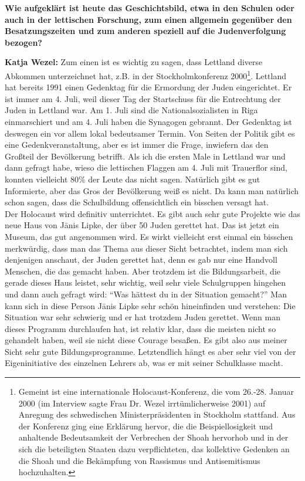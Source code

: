 \textbf{Wie aufgeklärt ist heute das Geschichtsbild, etwa in den Schulen oder auch in der lettischen Forschung, zum einen allgemein gegenüber den Besatzungszeiten und zum anderen speziell auf die Judenverfolgung bezogen?} 

\textbf{Katja Wezel:} Zum einen ist es wichtig zu sagen, dass Lettland diverse Abkommen unterzeichnet hat, z.B. in der Stockholmkonferenz 2000\footnote{Gemeint ist eine internationale Holocaust-Konferenz, die vom 26.-28. Januar 2000 (im Interview sagte Frau Dr. Wezel irrtümlicherweise 2001) auf Anregung des schwedischen Ministerpräsidenten in Stockholm stattfand. Aus der Konferenz ging eine Erklärung hervor, die die Beispiellosigkeit und anhaltende Bedeutsamkeit der Verbrechen der Shoah hervorhob und in der sich die beteiligten Staaten dazu verpflichteten, das kollektive Gedenken an die Shoah und die Bekämpfung von Rassismus und Antisemitismus hochzuhalten.}. Lettland hat bereits 1991 einen Gedenktag für die Ermordung der Juden eingerichtet. Er ist immer am 4. Juli, weil dieser Tag der Startschuss für die Entrechtung der Juden in Lettland war. Am 1. Juli sind die Nationalsozialisten in Riga einmarschiert und am 4. Juli haben die Synagogen gebrannt. Der Gedenktag ist deswegen ein vor allem lokal bedeutsamer Termin. Von Seiten der Politik gibt es eine Gedenkveranstaltung, aber es ist immer die Frage, inwiefern das den Großteil der Bevölkerung betrifft. Als ich die ersten Male in Lettland war und dann gefragt habe, wieso die lettischen Flaggen am 4. Juli mit Trauerflor sind, konnten vielleicht 80\% der Leute das nicht sagen. Natürlich gibt es gut Informierte, aber das Gros der Bevölkerung weiß es nicht. Da kann man natürlich schon sagen, dass die Schulbildung offensichtlich ein bisschen versagt hat.\\ 
Der Holocaust wird definitiv unterrichtet. Es gibt auch sehr gute Projekte wie das neue Haus von Jānis Lipke, der über 50 Juden gerettet hat. Das ist jetzt ein Museum, das gut angenommen wird. Es wirkt vielleicht erst einmal ein bisschen merkwürdig, dass man das Thema aus dieser Sicht betrachtet, indem man sich denjenigen anschaut, der Juden gerettet hat, denn es gab nur eine Handvoll Menschen, die das gemacht haben. Aber trotzdem ist die Bildungsarbeit, die gerade dieses Haus leistet, sehr wichtig, weil sehr viele Schulgruppen hingehen und dann auch gefragt wird: ``Was hättest du in der Situation gemacht?'' Man kann sich in diese Person Jānis Lipke sehr schön hineinfinden und verstehen: Die Situation war sehr schwierig und er hat trotzdem Juden gerettet. Wenn man dieses Programm durchlaufen hat, ist relativ klar, dass die meisten nicht so gehandelt haben, weil sie nicht diese Courage besaßen. Es gibt also aus meiner Sicht sehr gute Bildungsprogramme. Letztendlich hängt es aber sehr viel von der Eigeninitiative des einzelnen Lehrers ab, was er mit seiner Schulklasse macht. 
